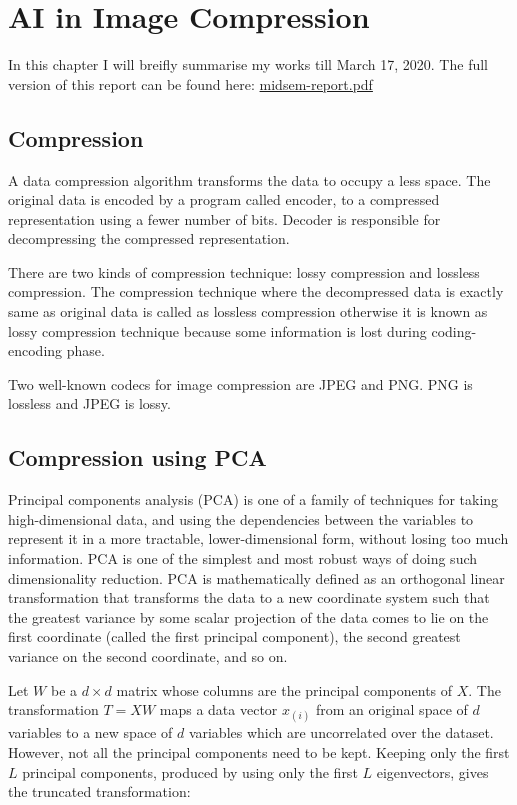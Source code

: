 \chapter{AI in Image Compression}
\label{ch:ai-image-compression}

In this chapter I will breifly summarise my works till March 17, 2020. The full version of this report can be found here: 
\href{https://github.com/KishoreKaushal/btp-report-phase2/blob/master/btp_report.pdf}{midsem-report.pdf}

\section{Compression}

A data compression algorithm transforms the data to occupy a less space.
The original data is encoded by a program called encoder, to a compressed  representation using a fewer number of bits.
Decoder is responsible for decompressing the compressed representation.

There are two kinds of compression technique: lossy compression and lossless compression. 
The compression technique where the decompressed data is exactly same as original data is called as lossless compression otherwise it is known as lossy compression technique because some information is lost during coding-encoding phase.

Two well-known codecs for image compression are JPEG and PNG. PNG is lossless and JPEG is lossy.

\section{Compression using PCA}

Principal components analysis (PCA) is one of a family of techniques for taking high-dimensional data, and using the dependencies between the variables to represent it in a more tractable, lower-dimensional form, without losing too much information. 
PCA is one of the simplest and most robust ways of doing such dimensionality reduction.
PCA is mathematically defined as an orthogonal linear transformation that transforms the data to a new coordinate system such that the greatest variance by some scalar projection of the data comes to lie on the first coordinate (called the first principal component), the second greatest variance on the second coordinate, and so on.


Let $W$ be a $d \times d$ matrix whose columns are the principal components of $X$. The transformation $T = X W$ maps a data vector $x_{(i)}$ from an original space of $d$ variables to a new space of $d$ variables which are uncorrelated over the dataset. However, not all the principal components need to be kept. Keeping only the first $L$ principal components, produced by using only the first $L$ eigenvectors, gives the truncated transformation:

